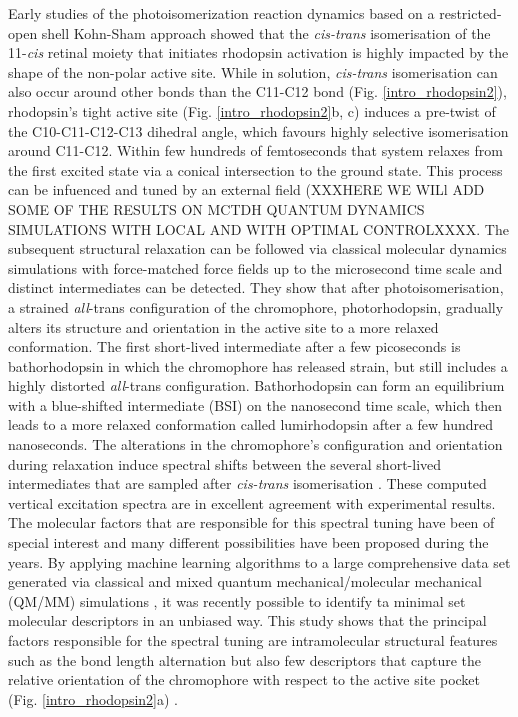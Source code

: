 \documentclass[journal=jacsat,manuscript=article]{achemso}
\begin{document}
Early studies of the photoisomerization reaction dynamics based on a
restricted-open shell Kohn-Sham approach \cite{rohrig2004molecular}
showed that the \emph{cis-trans} isomerisation of the 11-\emph{cis}
retinal moiety that initiates rhodopsin activation is highly impacted
by the shape of the non-polar active site. While in solution,
\emph{cis-trans} isomerisation can also occur around other bonds than
the C11-C12 bond
(Fig. \ref{intro_rhodopsin2})\cite{logunov1996excited,tsukida1977simultaneous},
rhodopsin's tight active site (Fig. \ref{intro_rhodopsin2}b, c)
induces a pre-twist of the C10-C11-C12-C13 dihedral angle, which
favours highly selective isomerisation around
C11-C12\cite{rohrig2004molecular,rohrig2002early}. Within few hundreds
of femtoseconds that system relaxes from the first excited state via a
conical intersection to the ground state. This process can be
infuenced and tuned by an external field (XXXHERE WE WILl ADD SOME OF
THE RESULTS ON MCTDH QUANTUM DYNAMICS SIMULATIONS WITH LOCAL AND WITH
OPTIMAL CONTROLXXXX. The subsequent structural relaxation can be
followed via classical molecular dynamics simulations with
force-matched force fields\cite{doemer2013generalized} up to the
microsecond time
scale\cite{rohrig2002early,neri2010role,vankeulenrhodopsin} and
distinct intermediates can be detected. They show that after
photoisomerisation, a strained \emph{all}-trans configuration of the
chromophore, photorhodopsin, gradually alters its structure and
orientation in the active site to a more relaxed conformation. The
first short-lived intermediate after a few picoseconds is
bathorhodopsin in which the chromophore has released strain, but still
includes a highly distorted \emph{all}-trans
configuration. Bathorhodopsin can form an equilibrium with a
blue-shifted intermediate (BSI) on the nanosecond time scale, which
then leads to a more relaxed conformation called lumirhodopsin after a
few hundred nanoseconds. The alterations in the chromophore's
configuration and orientation during relaxation induce spectral shifts
between the several short-lived intermediates that are sampled after
\emph{cis-trans} isomerisation \cite{sandberg2014low}. These computed
vertical excitation spectra are in excellent agreement with
experimental results. The molecular factors that are responsible for
this spectral tuning have been of special interest and many different
possibilities have been proposed during the years. By applying machine
learning algorithms to a large comprehensive data set generated via
classical and mixed quantum mechanical/molecular mechanical (QM/MM)
simulations , it was recently possible to identify ta minimal set
molecular descriptors in an unbiased way. This study shows that the
principal factors responsible for the spectral tuning are
intramolecular structural features such as the bond length alternation
but also few descriptors that capture the relative orientation of the
chromophore with respect to the active site pocket
(Fig. \ref{intro_rhodopsin2}a)
\cite{campomanes2014origin,valsson2013rhodopsin, vankeulenrhodopsin}.
\end{document}
